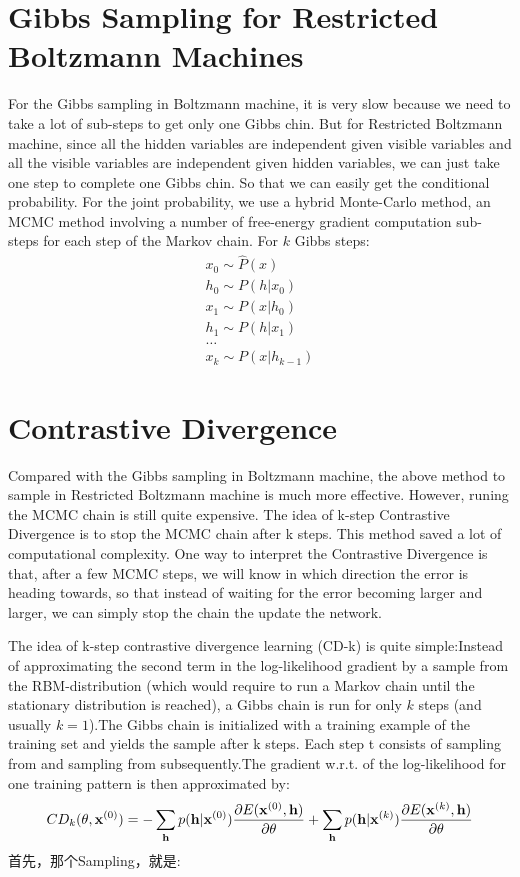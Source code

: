 \documentclass[11pt,fleqn, UTF8]{ctexbook} %
\begin{document}
\section{Gibbs Sampling for Restricted Boltzmann Machines}
For the Gibbs sampling in Boltzmann machine, it is very slow because we need to take a lot of sub-steps to get only one Gibbs chin. But for Restricted Boltzmann machine, since all the hidden variables are independent given visible variables and all the visible variables are independent given hidden variables, we can just take one step to complete one Gibbs chin. So that we can easily get the conditional probability. For the joint probability, we use a hybrid Monte-Carlo method, an MCMC method involving a number of free-energy gradient computation sub-steps for each step of the Markov chain. For $k$ Gibbs steps:
\begin{gather*}
  x_{0}\sim \hat{P}(x)\\
  h_{0}\sim P(h\vert x_{0})\\
  x_{1}\sim P(x\vert h_{0})\\
  h_{1}\sim P(h\vert x_{1})\\
  \dots \\
   x_{k} \sim P(x|h_{k-1})
\end{gather*}

\section{Contrastive Divergence}
Compared with the Gibbs sampling in Boltzmann machine, the above method to sample in Restricted Boltzmann machine is much more effective. However, runing the MCMC chain is still quite expensive. The idea of k-step Contrastive Divergence is to stop the MCMC chain after k steps. This method saved a lot of computational complexity. One way to interpret the Contrastive Divergence is that, after a few MCMC steps, we will know in which direction the error is heading towards, so that instead of waiting for the error becoming larger and larger, we can simply stop the chain the update the network.


The idea of k-step contrastive divergence learning (CD-k) is quite simple:Instead of approximating the second term in the log-likelihood gradient by a sample from the RBM-distribution (which would require to run a Markov chain until the stationary distribution is reached), a Gibbs chain is run for only $k$ steps (and usually $k=1$).The Gibbs chain is initialized with a training example  of the training set and yields the sample  after k steps. Each step t consists of sampling  from  and sampling  from  subsequently.The gradient w.r.t.  of the log-likelihood for one training pattern  is then approximated by:
\begin{equation}\label{CDk}
  CD_k(\bold{\theta},\bold{x}^{(0)})=-\sum_{\bold{h}}p(\bold{h}|\bold{x}^{(0)})
\frac{\partial E(\bold{x}^{(0)},\bold{h})}
{\partial \bold{\theta}}
+
\sum_{\bold{h}}p(\bold{h}|\bold{x}^{(k)})
\frac{\partial E(\bold{x}^{(k)},\bold{h})}
{\partial \bold{\theta}}
\end{equation}
首先，那个Sampling，就是:
\end{document}
